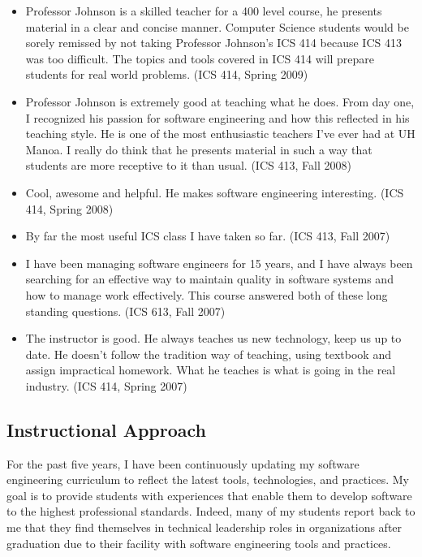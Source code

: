\documentclass[11pt]{article}
\begin{document}
\begin{itemize}
\item Professor Johnson is a skilled teacher for a 400 level course, he
  presents material in a clear and concise manner. Computer Science
  students would be sorely remissed by not taking Professor Johnson's ICS
  414 because ICS 413 was too difficult. The topics and tools covered in
  ICS 414 will prepare students for real world problems. (ICS 414, Spring
  2009)

\item Professor Johnson is extremely good at teaching what he does. From day one, I recognized his passion for software engineering and how this reflected in his teaching style. He is one of the most enthusiastic teachers I've ever had at UH Manoa. I really do think that he presents material in such a way that students are more receptive to it than usual. (ICS 413, Fall 2008)

\item Cool, awesome and helpful. He makes software engineering
  interesting. (ICS 414, Spring 2008)

\item  By far the most useful ICS class I have taken so far.  (ICS 413, Fall
  2007)

\item I have been managing software engineers for 15 years, and I have always been searching for an effective way to maintain quality in software systems and how to manage work effectively. This course answered both of these long standing questions. (ICS 613, Fall 2007)

\item The instructor is good. He always teaches us new technology, keep us
  up to date. He doesn't follow the tradition way of teaching, using
  textbook and assign impractical homework. What he teaches is what is
  going in the real industry. (ICS 414, Spring 2007)

\end{itemize}

\subsection{Instructional Approach}

For the past five years, I have been continuously updating my software
engineering curriculum to reflect the latest tools, technologies, and
practices.  My goal is to provide students with experiences that enable
them to develop software to the highest professional standards.  Indeed,
many of my students report back to me that they find themselves in
technical leadership roles in organizations after graduation due to their
facility with software engineering tools and practices.
\end{document}
